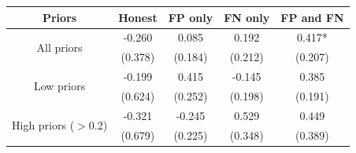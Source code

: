 \begin{table}[H]\centering \begin{tabular}{ccccc} \hline \hline
\textbf{Priors}&\textbf{Honest}&\textbf{FP only} &\textbf{FN only}& \textbf{FP and FN}\\ \hline
\multirow{2}{*}{All priors}&-0.260&0.085&0.192&0.417*\\
&(0.378)&(0.184)&(0.212)&(0.207)\\
\multirow{2}{*}{Low priors}&-0.199&0.415&-0.145&0.385\\
&(0.624)&(0.252)&(0.198)&(0.191)\\
\multirow{2}{*}{High priors ($>$0.2)}&-0.321&-0.245&0.529&0.449\\
&(0.679)&(0.225)&(0.348)&(0.389)\\
\hline \end{tabular} \end{table}
